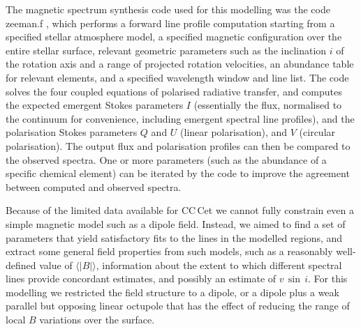 \documentclass[fleqn,usenatbib]{mnras}
\newcommand{\bs}{\ensuremath{\langle \vert B \vert \rangle}}
\newcommand{\vsini}{\ensuremath{v\,\sin\,i}}
\begin{document}
The magnetic spectrum synthesis code used for this modelling was the code {\sc zeeman.f} \citep{landstreet88-1}, which performs a forward line profile computation starting from a specified stellar atmosphere model, a specified magnetic configuration over the entire stellar surface, relevant geometric parameters such as the inclination $i$ of the rotation axis and a range of projected rotation velocities, an abundance table for relevant elements, and a specified wavelength window and line list.  The code solves the four coupled equations of polarised radiative transfer, and computes the expected emergent Stokes parameters $I$ (essentially the flux, normalised to the continuum for convenience, including emergent spectral line profiles), and the polarisation Stokes parameters $Q$ and $U$ (linear polarisation), and $V$ (circular polarisation). The output flux and polarisation profiles can then be compared to the observed spectra. One or more parameters (such as the abundance of a specific chemical element) can be iterated by the code to improve the agreement between computed and observed spectra.

Because of the limited data available for CC\,Cet we cannot fully constrain even a simple magnetic model such as a dipole field. Instead, we aimed to find a set of parameters that yield satisfactory fits to the lines in the modelled regions, and extract some general field properties from such models, such as a reasonably well-defined value of \bs, information about the extent to which different spectral lines provide concordant estimates, and possibly an estimate of \vsini. For this modelling we restricted the field structure to a dipole, or a dipole plus a weak parallel but opposing linear octupole that has the effect of reducing the range of local $B$ variations over the surface.


\end{document}
